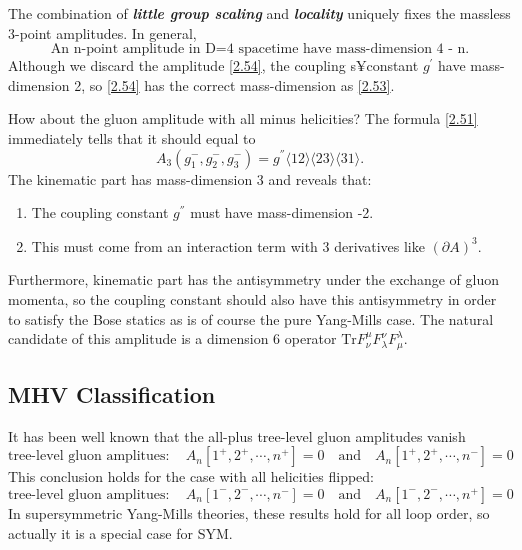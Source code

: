 \documentclass[12pt]{article}
\numberwithin{equation}{section}
\newcommand{\mdavg}[2]{\langle #1 \rangle\!\langle #2 \rangle}
\newcommand{\avg}[1]{\langle #1 \rangle}
\newcommand{\tif}[1]{\textit{\textbf{#1}}}
\begin{document}
The combination of \tif{little group scaling} and \tif{locality} uniquely fixes the massless 3-point amplitudes. In general, 
\begin{equation}
    \text{An n-point amplitude in D=4 spacetime have mass-dimension 4 - n.}
\end{equation}
Although we discard the amplitude \eqref{2.54}, the coupling s¥constant $g^{'}$ have mass-dimension 2, so \eqref{2.54} has the correct mass-dimension as \eqref{2.53}.

How about the gluon amplitude with all minus helicities? The formula \eqref{2.51} immediately tells that it should equal to
\begin{equation}
    A_3(g_1^-,g_2^-,g_3^-)=g^{''}\mdavg{12}{23}\!\avg{31}.
\end{equation}
The kinematic part has mass-dimension 3 and reveals that: 
\begin{enumerate}
    \item The coupling constant $g^{''}$ must have mass-dimension -2.
    \item This must come from an interaction term with 3 derivatives like $(\partial A)^3$.
\end{enumerate}
Furthermore, kinematic part has the antisymmetry under the exchange of gluon momenta, so the coupling constant should 
also have this antisymmetry in order to satisfy the Bose statics as is of course the pure Yang-Mills case. 
The natural candidate of this amplitude is a dimension 6 operator $\mathrm{Tr}F^\mu_\nu F^\nu_\lambda F^\lambda _\mu$. 

\subsection{MHV Classification}
It has been well known that the all-plus tree-level gluon amplitudes vanish
\begin{equation}
    \text{tree-level gluon amplitues}: \quad A_n[1^+,2^+,\cdots,n^+]=0 \quad\text{and}\quad A_n[1^+,2^+,\cdots,n^-]=0
\end{equation}
This conclusion holds for the case with all helicities flipped:
\begin{equation}
    \text{tree-level gluon amplitues}: \quad A_n[1^-,2^-,\cdots,n^-]=0 \quad\text{and}\quad A_n[1^-,2^-,\cdots,n^+]=0
\end{equation}
In supersymmetric Yang-Mills theories, these results hold for all loop order, so actually it is a special case for SYM.
\end{document}
